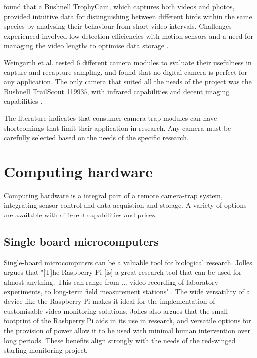 \cite{ribeiro-silva2018testing} found that a Bushnell TrophyCam, which captures both videos and photos, provided intuitive data for distinguishing between different birds within the same species by analysing their behaviour from short video intervals. Challenges experienced involved low detection efficiencies with motion sensors and a need for managing the video lengths to optimise data storage \cite{ribeiro-silva2018testing}. 

Weingarth et al. \cite{weingarth2013evaluation} tested 6 different camera modules to evaluate their usefulness in capture and recapture sampling, and found that no digital camera is perfect for any application. The only camera that suited all the needs of the project was the Bushnell TrailScout 119935, with infrared capabilities and decent imaging capabilities \cite{weingarth2013evaluation}. 

The literature indicates that consumer camera trap modules can have shortcomings that limit their application in research. Any camera must be carefully selected based on the needs of the specific research.

\section{Computing hardware}

Computing hardware is a integral part of a remote camera-trap system, integrating sensor control and data acquistion and storage. A variety of options are available with different capabilities and prices.

\subsection{Single board microcomputers}

Single-board microcomputers can be a valuable tool for biological research. Jolles argues that "[T]he Raspberry Pi [is] a great research tool that can be used for almost anything. This can range from ... video recording of laboratory experiments, to long-term field measurement stations" \cite{jolles2021broad-scale}. The wide versatility of a device like the Raspberry Pi makes it ideal for the implementation of customisable video monitoring solutions. Jolles \cite{jolles2021broad-scale} also argues that the small footprint of the Rasbperry Pi aids in its use in research, and versatile options for the provision of power allow it to be used with minimal human intervention over long periods. These benefits align strongly with the needs of the red-winged starling monitoring project.

